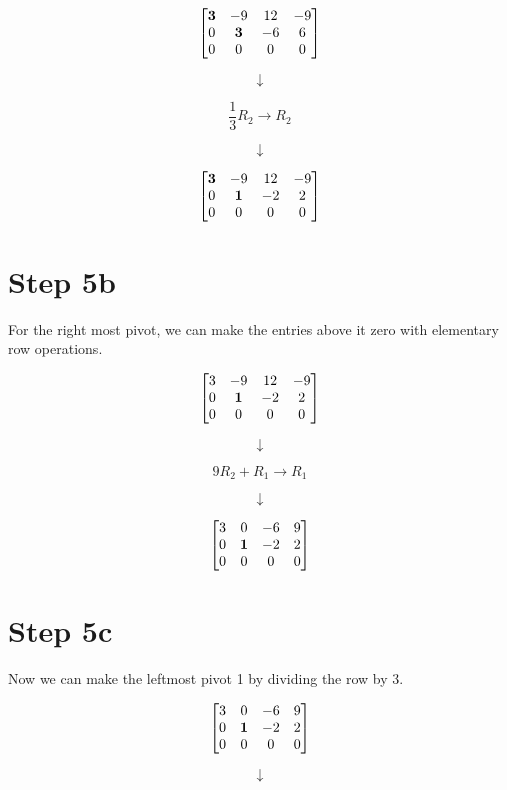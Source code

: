 \documentclass[
  letterpaper,
  DIV=11,
  numbers=noendperiod]{scrreprt}
\begin{document}
\[
\begin{bmatrix}
    \bf{3} & -9 & 12 & -9 \\
    0 & \bf{3} & -6 & 6 \\
    0 & 0 & 0 & 0
\end{bmatrix}
\]

\[
\downarrow
\]

\[
\frac{1}{3}R_2 \rightarrow R_2
\]

\[
\downarrow
\]

\[
\begin{bmatrix}
    \bf{3} & -9 & 12 & -9 \\
    0 & \bf{1} & -2 & 2 \\
    0 & 0 & 0 & 0
\end{bmatrix}
\]

\chapter{Step 5b}

For the right most pivot, we can make the entries above it zero with
elementary row operations.

\[
\begin{bmatrix}
    3 & -9 & 12 & -9 \\
    0 & \bf{1} & -2 & 2 \\
    0 & 0 & 0 & 0
\end{bmatrix}
\]

\[
\downarrow
\]

\[
9R_2 + R_1 \rightarrow R_1
\]

\[
\downarrow
\]

\[
\begin{bmatrix}
    3 & 0 & -6 & 9 \\
    0 & \bf{1} & -2 & 2 \\
    0 & 0 & 0 & 0
\end{bmatrix}
\]

\chapter{Step 5c}

Now we can make the leftmost pivot 1 by dividing the row by 3.

\[
\begin{bmatrix}
    3 & 0 & -6 & 9 \\
    0 & \bf{1} & -2 & 2 \\
    0 & 0 & 0 & 0
\end{bmatrix}
\]

\[
\downarrow
\]
\end{document}
